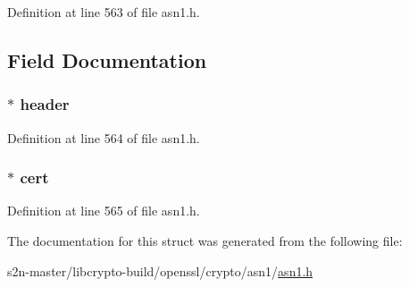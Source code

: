 Definition at line 563 of file asn1.\+h.



\subsection{Field Documentation}
\subsubsection[{\texorpdfstring{header}{header}}]{ $\ast$ header}\hypertarget{struct_n_e_t_s_c_a_p_e___x509__st_a7e0a82ad04ea0d1a7839912a32169f09}{}\label{struct_n_e_t_s_c_a_p_e___x509__st_a7e0a82ad04ea0d1a7839912a32169f09}


Definition at line 564 of file asn1.\+h.

\subsubsection[{\texorpdfstring{cert}{cert}}]{ $\ast$ cert}\hypertarget{struct_n_e_t_s_c_a_p_e___x509__st_a2fb0a168ce33f1f9ce519813d94887f0}{}\label{struct_n_e_t_s_c_a_p_e___x509__st_a2fb0a168ce33f1f9ce519813d94887f0}


Definition at line 565 of file asn1.\+h.



The documentation for this struct was generated from the following file\+:\begin{DoxyCompactItemize}
\item 
s2n-\/master/libcrypto-\/build/openssl/crypto/asn1/\hyperlink{crypto_2asn1_2asn1_8h}{asn1.\+h}\end{DoxyCompactItemize}
